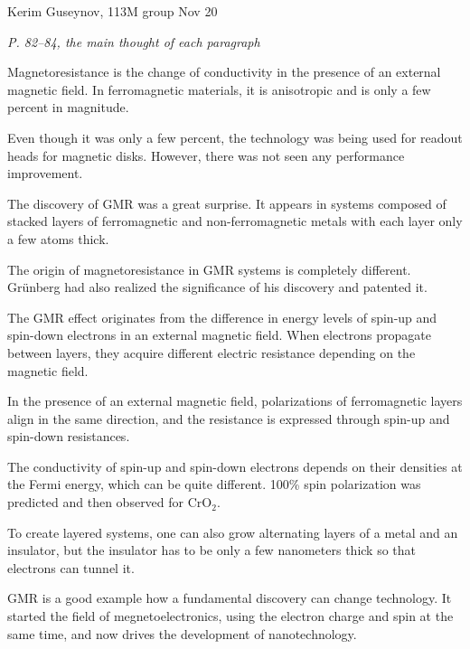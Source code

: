 \documentclass[a4paper, 12pt]{article}
\def\task#1{\begin{center}\it #1\end{center}}
\newif\ifcols
\begin{document}
\noindent
Kerim Guseynov, 113M group
\hfill
Nov 20

\task{P. 82--84, the main thought of each paragraph}
\ifcols\begin{multicols}{2}\fi%
	Magnetoresistance is the change of conductivity in the presence 
	of an external magnetic field. In ferromagnetic materials, it is 
	anisotropic and is only a few percent in magnitude.

	Even though it was only a few percent, the technology was being 
	used for readout heads for magnetic disks. However, there was 
	not seen any performance improvement.

	The discovery of GMR was a great surprise. It appears in systems 
	composed of stacked layers of ferromagnetic and 
	non-ferromagnetic metals with each layer only a few atoms thick.

	The origin of magnetoresistance in GMR systems is completely 
	different. Gr\"{u}nberg had also realized the significance of 
	his discovery and patented it.

	The GMR effect originates from the difference in energy levels 
	of spin-up and spin-down electrons in an external magnetic 
	field. When electrons propagate between layers, they acquire 
	different electric resistance depending on the magnetic field.

	In the presence of an external magnetic field, polarizations of 
	ferromagnetic layers align in the same direction, and the 
	resistance is expressed through spin-up and spin-down 
	resistances.

	The conductivity of spin-up and spin-down electrons depends on 
	their densities at the Fermi energy, which can be quite 
	different. 100\% spin polarization was predicted and then 
	observed for CrO$_2$.

	To create layered systems, one can also grow alternating layers 
	of a metal and an insulator, but the insulator has to be only 
	a few nanometers thick so that electrons can tunnel it.

	GMR is a good example how a fundamental discovery can change 
	technology. It started the field of megnetoelectronics, using 
	the electron charge and spin at the same time, and now drives 
	the development of nanotechnology.
\ifcols\end{multicols}\fi%
\end{document}
